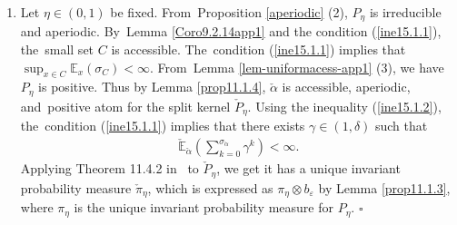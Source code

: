 \documentclass[11pt]{elsarticle}
\def\geq{\geqslant}
\def\leq{\leqslant}
\def\E{\mathbb{E}}
\def\N{\mathbb{N}}
\def\R{\mathbb{R}}
\begin{document}
\begin{pf}
\begin{enumerate}
		Consider the shift operator $T$, defined by $T(\omega_0,\omega_1\ldots):=(\omega_1,\omega_2\ldots)$, for~any\linebreak   $\omega=(\omega_0,\omega_1\ldots)\in\R^{\N}$. Define inductively $T_0$ as the identity function, i.e.,~ $T_0(\omega)=\omega$, for~$\omega\in\R^{\N}$; and $T_n=T_{n-1}\circ T$, for~$n\geq1$.  Notice that $\sigma_{\check{\alpha}}\leq \sigma_{\check{C}}+\sigma_{\check{\alpha}}\circ T_{\sigma_{\check{C}}}$ on the event $\{\sigma_{\check{C}}<\infty\}$ and using Lemma \ref{prop11.1.2}, we get
		\begin{align*}
			\check{\E}_{\xi\otimes b_\varepsilon}\left(\sum_{k=0}^{\sigma_{\check{\alpha}}}\gamma^k\right)\leq&\check{\E}_{\xi\otimes b_\varepsilon}\left(\sum_{k=0}^{\sigma_{\check{C}}-1}\gamma^k\right)+\check{\E}_{\xi\otimes b_\varepsilon}\left(\sum_{k=\sigma_{\check{C}}}^{\sigma_{\check{\alpha}\circ T_{\sigma_{\check{C}}}}}\gamma^k\right)\\
			\leq&\check{\E}_{\xi\otimes b_\varepsilon}\left(\sum_{k=0}^{\sigma_{\check{C}}-1}\gamma^k\right)+\check{\E}_{\xi\otimes b_\varepsilon}\left(\gamma^{\sigma_{\check{C}}}\right)\sup_{(x,d)\in \check{C}}\check{\E}_{(x,d)}\left(\sum_{k=0}^{\sigma_{\check{\alpha}}}\gamma^k\right)\\
			\leq&\E_{\xi}\left(\sum_{k=0}^{\sigma_C-1}\gamma^k\right)\left[1+\gamma\sup_{(x,d)\in\check{C}}\check{\E}_{(x,d)}\left(\sum_{k=0}^{\sigma_{\check{\alpha}}}\gamma^k\right)\right].
		\end{align*}
		Therefore, by~(\ref{ine15.1.2}) and (\ref{ine15.1.1}), there exists $\tau_1\in (\tau,\infty)$ such that the inequality (\ref{ine15.1.3}) is satisfied.
		
		\item[(2)] Let $\eta\in(0,1)$ be fixed. From~Proposition \ref{aperiodic} (2), $P_\eta$ is irreducible and aperiodic. By~Lemma \ref{Coro9.2.14app1} and the condition (\ref{ine15.1.1}), the~small set $C$ is accessible. The~condition (\ref{ine15.1.1}) implies that $\sup_{x\in C}\E_x(\sigma_C)<\infty$. From~Lemma \ref{lem-uniformacess-app1} (3), we have $P_\eta$ is positive. Thus by Lemma \ref{prop11.1.4}, $\check{\alpha}$ is accessible, aperiodic, and~positive atom for the split kernel $\check{P}_\eta$. Using the inequality (\ref{ine15.1.2}), the~condition (\ref{ine15.1.1}) implies that there exists $\gamma\in(1,\delta)$ such that
		\begin{align}\label{ine1}
			\check{\E}_{\check{\alpha}}\left(\sum_{k=0}^{\sigma_{\check{\alpha}}}\gamma^k\right)<\infty.
		\end{align}
		{Applying} {Theorem 11.4.2} in~\cite{DMPS18} to $\check{P}_\eta$, we get it has a unique invariant probability measure $\check{\pi}_{\eta}$, which is expressed as $\pi_\eta\otimes b_\varepsilon$ by Lemma \ref{prop11.1.3}, where $\pi_\eta$ is the unique invariant probability measure for $P_\eta$. \hfill$\square$
	\end{enumerate}
\end{pf}
\end{document}
